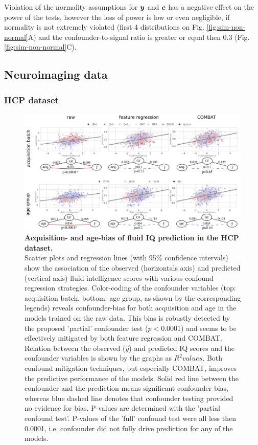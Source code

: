 \documentclass{article}
\begin{document}
Violation of the normality assumptions for $\boldsymbol{y}$ and $\boldsymbol{c}$ has a negative effect on the power of the tests, however the loss of power is low or even negligible, if normality is not extremely violated (first 4 distributions on Fig. \ref{fig:sim-non-normal}A) and the confounder-to-signal ratio is greater or equal then 0.3 (Fig. \ref{fig:sim-non-normal}C).

\subsection{Neuroimaging data}
\subsubsection*{HCP dataset}

\begin{figure}[!b]
  \centering
  \includegraphics[width=0.75\paperwidth]{fig/fig_hcp.png}
  \caption{\textbf{Acquisition- and age-bias of fluid IQ prediction in the HCP dataset.} \\
  Scatter plots and regression lines (with 95\% confidence intervals) show the association of the observed (horizontals axis) and predicted (vertical axis) fluid intelligence scores with various confound regression strategies. Color-coding of the confounder variables (top: acquisition batch, bottom: age group, as shown by the corresponding legends) reveals confounder-bias for both acquisition and age in the models trained on the raw data. This bias is robustly detected by the proposed 'partial' confounder test ($p<0.0001$) and seems to be effectively mitigated by both feature regression and COMBAT.
  Relation between the observed ($\hat{y}$) and predicted IQ scores and the confounder variables is shown by the graphs as $R^2 values$. Both confound mitigation techniques, but especially COMBAT, improves the predictive performance of the models.
  Solid red line between the confounder and the prediction means significant confounder bias, whereas blue dashed line denotes that confounder testing provided no evidence for bias. P-values are determined with the 'partial confound test'. P-values of the 'full' confound test were all less then 0.0001, i.e. confounder did not fully drive prediction for any of the models.
  }
  \label{fig:hcp}
\end{figure}
\end{document}
